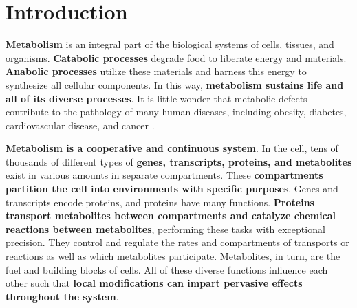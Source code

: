 
\section{Introduction}



\textbf{Metabolism} is an integral part of the biological systems of cells, tissues, and organisms.
\textbf{Catabolic processes} degrade food to liberate energy and materials.
\textbf{Anabolic processes} utilize these materials and harness this energy to synthesize all cellular components.
In this way, \textbf{metabolism sustains life and all of its diverse processes}.
It is little wonder that metabolic defects contribute to the pathology of many human diseases, including obesity, diabetes, cardiovascular disease, and cancer \supercite{van_der_klaauw_hunger_2015, haslam_obesity_2005}.

\textbf{Metabolism is a cooperative and continuous system}.
In the cell, tens of thousands of different types of \textbf{genes, transcripts, proteins, and metabolites} exist in various amounts in separate compartments.
These \textbf{compartments partition the cell into environments with specific purposes}.
Genes and transcripts encode proteins, and proteins have many functions.
\textbf{Proteins transport metabolites between compartments and catalyze chemical reactions between metabolites}, performing these tasks with exceptional precision.
They control and regulate the rates and compartments of transports or reactions as well as which metabolites participate.
Metabolites, in turn, are the fuel and building blocks of cells.
All of these diverse functions influence each other such that \textbf{local modifications can impart pervasive effects throughout the system}.


